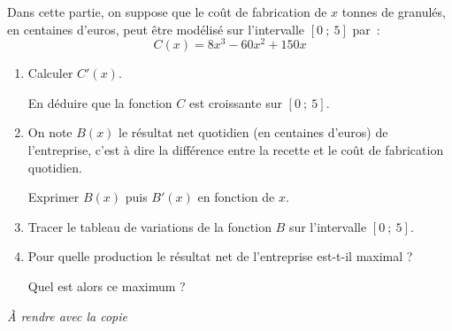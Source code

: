 \par
%
%
\par
Dans cette partie, on suppose que le coût de fabrication de $x$ tonnes de granulés, en centaines d'euros, peut être modélisé sur l'intervalle $[0~;~5]$ par~:
\[ C(x)=8x^3-60x^2+150x \]
\begin{enumerate}
     \item Calculer $C'(x)$.
     \par
     En déduire que la fonction $C$ est croissante sur $[0~;~5]$.
     \par
     \medskip
     \par
     \item On note $B(x)$ le résultat net quotidien (en centaines d'euros) de l'entreprise, c'est à dire la différence entre la recette et le coût de fabrication quotidien.
     \par
     Exprimer $B(x)$ puis $B'(x)$ en fonction de $x$.
     \par
     \medskip
     \par
     \item Tracer le tableau de variations de la fonction $B$ sur l'intervalle $[0~;~5]$.
     \par
     \medskip
     \par
     \item Pour quelle production le résultat net de l'entreprise est-t-il maximal ?
     \par
     Quel est alors ce maximum ?
     \par
     \medskip
     \par
\end{enumerate}
%
%
%
%
%
\medskip
%
\begin{center}
     \emph{\`A rendre avec la copie}
\end{center}
%
\bigskip
%

